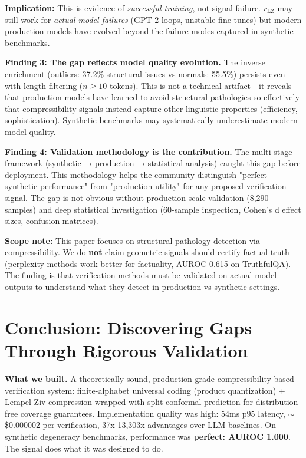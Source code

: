 \documentclass[11pt]{article}
\begin{document}
\textbf{Implication:} This is evidence of \textit{successful training}, not signal failure. $r_{\text{LZ}}$ may still work for \textit{actual model failures} (GPT-2 loops, unstable fine-tunes) but modern production models have evolved beyond the failure modes captured in synthetic benchmarks.

\textbf{Finding 3: The gap reflects model quality evolution.} The inverse enrichment (outliers: 37.2\% structural issues vs normals: 55.5\%) persists even with length filtering ($n \geq 10$ tokens). This is not a technical artifact---it reveals that production models have learned to avoid structural pathologies so effectively that compressibility signals instead capture other linguistic properties (efficiency, sophistication). Synthetic benchmarks may systematically underestimate modern model quality.

\textbf{Finding 4: Validation methodology is the contribution.} The multi-stage framework (synthetic → production → statistical analysis) caught this gap before deployment. This methodology helps the community distinguish "perfect synthetic performance" from "production utility" for any proposed verification signal. The gap is not obvious without production-scale validation (8,290 samples) and deep statistical investigation (60-sample inspection, Cohen's d effect sizes, confusion matrices).

\textbf{Scope note:} This paper focuses on structural pathology detection via compressibility. We do \textbf{not} claim geometric signals should certify factual truth (perplexity methods work better for factuality, AUROC 0.615 on TruthfulQA). The finding is that verification methods must be validated on actual model outputs to understand what they detect in production vs synthetic settings.

\section{Conclusion: Discovering Gaps Through Rigorous Validation}
\label{sec:conclusion}

\textbf{What we built.} A theoretically sound, production-grade compressibility-based verification system: finite-alphabet universal coding (product quantization) + Lempel-Ziv compression wrapped with split-conformal prediction for distribution-free coverage guarantees. Implementation quality was high: 54ms p95 latency, $\sim$\$0.000002 per verification, 37x-13,303x advantages over LLM baselines. On synthetic degeneracy benchmarks, performance was \textbf{perfect: AUROC 1.000}. The signal does what it was designed to do.
\end{document}
